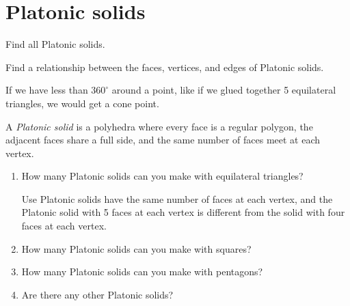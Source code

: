 \documentclass[newpage,hints,handout]{ximera}
\begin{document}
\section{Platonic solids}
\begin{listOutcomes}
\item Find all Platonic solids.
\item Find a relationship between the faces, vertices, and edges of Platonic solids.
\end{listOutcomes}
If we have less than $360^\circ$ around a point, like if we glued together 5 equilateral triangles, we would get a cone point. 

\begin{definition}
 A \emph{Platonic solid} is a polyhedra where every face is a regular polygon, the adjacent faces share a full side, and the same number of faces meet at each vertex.
\end{definition}

\begin{problem}
\begin{enumerate}
 \item How many Platonic solids can you make with equilateral triangles? 
 \begin{hint} Use Platonic solids have the same number of faces at each vertex, and the Platonic solid with 5 faces at each vertex is different from the solid with four faces at each vertex.
 \end{hint}
 \item How many Platonic solids can you make with squares?
 \item How many Platonic solids can you make with pentagons?
 \item Are there any other Platonic solids?
\end{enumerate}
\end{problem}
\end{document}
